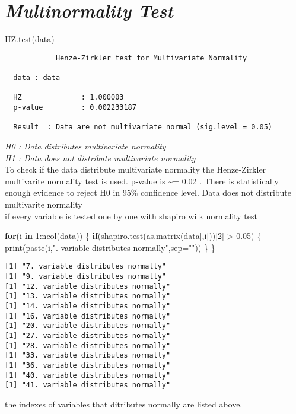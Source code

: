 \documentclass[12pt,twoside]{deuthesis}
\newenvironment{Shaded}{\begin{snugshade}}{\end{snugshade}}
\newcommand{\AttributeTok}[1]{\textcolor[rgb]{0.77,0.63,0.00}{#1}}
\newcommand{\ControlFlowTok}[1]{\textcolor[rgb]{0.13,0.29,0.53}{\textbf{#1}}}
\newcommand{\DecValTok}[1]{\textcolor[rgb]{0.00,0.00,0.81}{#1}}
\newcommand{\FloatTok}[1]{\textcolor[rgb]{0.00,0.00,0.81}{#1}}
\newcommand{\FunctionTok}[1]{\textcolor[rgb]{0.00,0.00,0.00}{#1}}
\newcommand{\NormalTok}[1]{#1}
\newcommand{\SpecialCharTok}[1]{\textcolor[rgb]{0.00,0.00,0.00}{#1}}
\newcommand{\StringTok}[1]{\textcolor[rgb]{0.31,0.60,0.02}{#1}}
\begin{document}
\hypertarget{multinormality-test}{%
\section{\texorpdfstring{\emph{Multinormality Test}}{Multinormality Test}}\label{multinormality-test}}
\begin{Shaded}
\begin{Highlighting}[]
\FunctionTok{HZ.test}\NormalTok{(data)}
\end{Highlighting}
\end{Shaded}
\begin{verbatim}
            Henze-Zirkler test for Multivariate Normality 

  data : data 

  HZ              : 1.000003 
  p-value         : 0.002233187 

  Result  : Data are not multivariate normal (sig.level = 0.05) 
\end{verbatim}
\emph{H0 : Data distributes multivariate normality}\\
\emph{H1 : Data does not distribute multivariate normality}\\

To check if the data distribute multivariate normality the Henze-Zirkler multivarite normality test is used. p-value is \textasciitilde= 0.02 . There is statistically enough evidence to reject H0 in 95\% confidence level. Data does not distribute multivarite normality\\

if every variable is tested one by one with shapiro wilk normality test\\
\begin{Shaded}
\begin{Highlighting}[]
\ControlFlowTok{for}\NormalTok{(i }\ControlFlowTok{in} \DecValTok{1}\SpecialCharTok{:}\FunctionTok{ncol}\NormalTok{(data)) \{}
  \ControlFlowTok{if}\NormalTok{(}\FunctionTok{shapiro.test}\NormalTok{(}\FunctionTok{as.matrix}\NormalTok{(data[,i]))[}\DecValTok{2}\NormalTok{] }\SpecialCharTok{\textgreater{}} \FloatTok{0.05}\NormalTok{) \{}
    \FunctionTok{print}\NormalTok{(}\FunctionTok{paste}\NormalTok{(i,}\StringTok{". variable distributes normally"}\NormalTok{,}\AttributeTok{sep=}\StringTok{""}\NormalTok{))}
\NormalTok{  \}}
\NormalTok{\}}
\end{Highlighting}
\end{Shaded}
\begin{verbatim}
[1] "7. variable distributes normally"
[1] "9. variable distributes normally"
[1] "12. variable distributes normally"
[1] "13. variable distributes normally"
[1] "14. variable distributes normally"
[1] "16. variable distributes normally"
[1] "20. variable distributes normally"
[1] "27. variable distributes normally"
[1] "28. variable distributes normally"
[1] "33. variable distributes normally"
[1] "36. variable distributes normally"
[1] "40. variable distributes normally"
[1] "41. variable distributes normally"
\end{verbatim}
the indexes of variables that ditributes normally are listed above.
\end{document}
